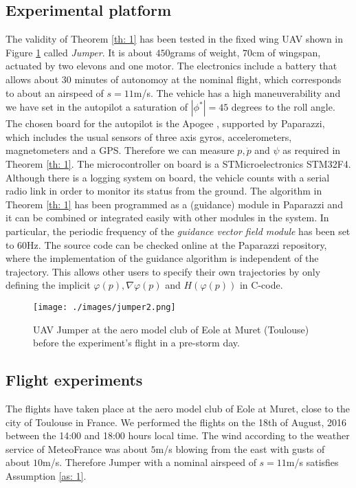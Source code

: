 \documentclass[letterpaper, 10 pt, conference]{ieeeconf}  %
\begin{document}
\subsection{Experimental platform}
The validity of Theorem \ref{th: 1} has been tested in the fixed wing UAV shown in Figure \ref{fig: jump} called \emph{Jumper}. It is about $450$grams of weight, $70$cm of wingspan, actuated by two elevons and one motor. The electronics include a battery that allows about $30$ minutes of autonomoy at the nominal flight, which corresponds to about an airspeed of $s = 11$m/s. The vehicle has a high maneuverability and we have set in the autopilot a saturation of $|\phi^*| = 45$ degrees to the roll angle. The chosen board for the autopilot is the Apogee \cite{papa}, supported by Paparazzi, which includes the usual sensors of three axis gyros, accelerometers, magnetometers and a GPS. Therefore we can measure $p, \dot p$ and $\psi$ as required in Theorem \ref{th: 1}. The microcontroller on board is a STMicroelectronics STM32F4. Although there is a logging system on board, the vehicle counts with a serial radio link in order to monitor its status from the ground. The algorithm in Theorem \ref{th: 1} has been programmed as a (guidance) module in Paparazzi and it can be combined or integrated easily with other modules in the system. In particular, the periodic frequency of the \emph{guidance vector field module} has been set to $60$Hz. The source code can be checked online at the Paparazzi repository, where the implementation of the guidance algorithm is independent of the trajectory. This allows other users to specify their own trajectories by only defining the implicit $\varphi(p), \nabla\varphi(p)$ and $H(\varphi(p))$ in C-code. %

\begin{figure}
\centering
\texttt{[image: ./images/jumper2.png]}
	\caption{UAV Jumper at the aero model club of Eole at Muret (Toulouse) before the experiment's flight in a pre-storm day.}
\label{fig: jump}
\end{figure}

\subsection{Flight experiments}
The flights have taken place at the aero model club of Eole at Muret, close to the city of Toulouse in France. We performed the flights on the 18th of August, 2016 between the 14:00 and 18:00 hours local time. The wind according to the weather service of MeteoFrance was about $5$m/s blowing from the east with gusts of about $10$m/s. Therefore Jumper with a nominal airspeed of $s=11$m/s satisfies Assumption \ref{as: 1}.
\end{document}
